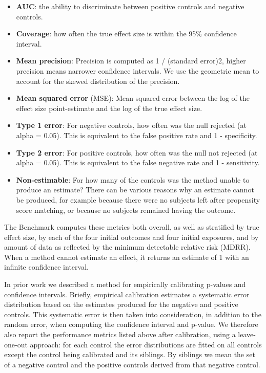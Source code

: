 \documentclass[]{article}
\providecommand{\tightlist}{%
  \setlength{\itemsep}{0pt}\setlength{\parskip}{0pt}}
\begin{document}
\begin{itemize}
\tightlist
\item
  \textbf{AUC}: the ability to discriminate between positive controls
  and negative controls.
\item
  \textbf{Coverage}: how often the true effect size is within the 95\%
  confidence interval.
\item
  \textbf{Mean precision}: Precision is computed as 1 / (standard
  error)2, higher precision means narrower confidence intervals. We use
  the geometric mean to account for the skewed distribution of the
  precision.
\item
  \textbf{Mean squared error} (MSE): Mean squared error between the log
  of the effect size point-estimate and the log of the true effect size.
\item
  \textbf{Type 1 error}: For negative controls, how often was the null
  rejected (at alpha = 0.05). This is equivalent to the false positive
  rate and 1 - specificity.
\item
  \textbf{Type 2 error}: For positive controls, how often was the null
  not rejected (at alpha = 0.05). This is equivalent to the false
  negative rate and 1 - sensitivity.
\item
  \textbf{Non-estimable}: For how many of the controls was the method
  unable to produce an estimate? There can be various reasons why an
  estimate cannot be produced, for example because there were no
  subjects left after propensity score matching, or because no subjects
  remained having the outcome.
\end{itemize}

The Benchmark computes these metrics both overall, as well as stratified
by true effect size, by each of the four initial outcomes and four
initial exposures, and by amount of data as reflected by the minimum
detectable relative risk (MDRR). When a method cannot estimate an
effect, it returns an estimate of 1 with an infinite confidence
interval.

In prior work we described a method for empirically calibrating p-values
and confidence intervals. Briefly, empirical calibration estimates a
systematic error distribution based on the estimates produced for the
negative and positive controls. This systematic error is then taken into
consideration, in addition to the random error, when computing the
confidence interval and p-value. We therefore also report the
performance metrics listed above after calibration, using a
leave-one-out approach: for each control the error distributions are
fitted on all controls except the control being calibrated and its
siblings. By siblings we mean the set of a negative control and the
positive controls derived from that negative control.
\end{document}
